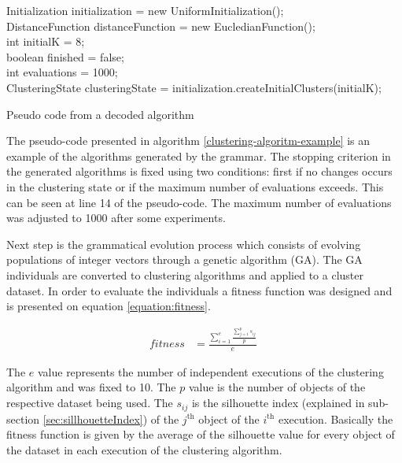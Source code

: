 \documentclass[journal]{IEEEtran}
\begin{document}
	\begin{algorithm}[!htb]
		\label{clustering-algoritm-example}
		Initialization initialization = new UniformInitialization(); \\
		DistanceFunction distanceFunction = new EucledianFunction(); \\
		int initialK = 8; \\
		boolean finished = false; \\
		int evaluations = 1000;\\
		ClusteringState 
		clusteringState = initialization.createInitialClusters(initialK); \\
		\caption{Pseudo code from a decoded algorithm}
	\end{algorithm}
	
	The pseudo-code presented in algorithm \ref{clustering-algoritm-example} is an example of the algorithms generated by the grammar. The stopping criterion in the generated algorithms is fixed using two conditions: first if no changes occurs in the clustering state or if the maximum number of evaluations exceeds. This can be seen at line 14 of the pseudo-code. The maximum number of evaluations was adjusted to 1000 after some experiments.
	
	Next step is the grammatical evolution process which consists of evolving populations of integer vectors through a genetic algorithm (GA). The GA individuals are converted to clustering algorithms and applied to a cluster dataset. In order to evaluate the individuals a fitness function was designed and is presented on equation \ref{equation:fitness}.
	
	\begin{align}
	\label{equation:fitness}
	fitness    &= \frac{\sum_{i=1}^e \frac{\sum_{j=1}^{p} s_{ij}}{p}}{e}
	\
	\end{align}
	
	The $e$ value represents the number of independent executions of the clustering algorithm and was fixed to 10. The $p$ value is the number of objects of the respective dataset being used. The $s_{ij}$ is the silhouette index (explained in sub-section \ref{sec:sillhouetteIndex}) of the $j^{\text{th}}$ object of the $i^{\text{th}}$ execution. Basically the fitness function is given by the average of the silhouette value for every object of the dataset in each execution of the clustering algorithm.
	
\end{document}
